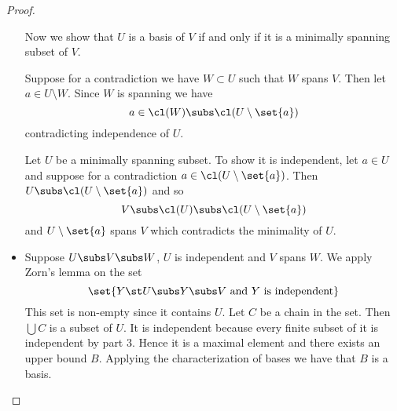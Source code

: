 \begin{proof}
\begin{itemize}
            Now we show that $U$ is a basis of $V$ if and only if it is a
            minimally spanning subset of $V$.

            \begin{forward}
                Suppose for a contradiction we have $W \subset U$ such that
                $W$ spans $V$.
                Then let $a \in U \setminus W$.
                Since $W$ is spanning we have
                \[a \in \cl(W) \subs \cl(U \setminus \set{a})\]
                contradicting independence of $U$.
            \end{forward}

            \begin{backward}
                Let $U$ be a minimally spanning subset.
                To show it is independent,
                let $a \in U$ and suppose for a contradiction
                $a \in \cl(U \setminus \set{a})$.
                Then $U \subs \cl(U \setminus \set{a})$ and so
                \[V \subs \cl(U) \subs \cl(U \setminus \set{a})\]
                and $U \setminus \set{a}$ spans $V$
                which contradicts the minimality of $U$.
            \end{backward}
        \item
        Suppose $U \subs V \subs W$, $U$ is independent and
        $V$ spans $W$.
        We apply Zorn's lemma on the set
        \[
            \set{Y \st U \subs Y \subs V \text{ and }
            Y \text{ is independent}}
        \]
        This set is non-empty since it contains $U$.
        Let $C$ be a chain in the set.
        Then $\bigcup C$ is a subset of $U$.
        It is independent because every finite subset of it is independent
        by part $3$.
        Hence it is a maximal element and there exists an upper bound $B$.
        Applying the characterization of bases we have that $B$ is a basis.
    \end{itemize}
\end{proof}

